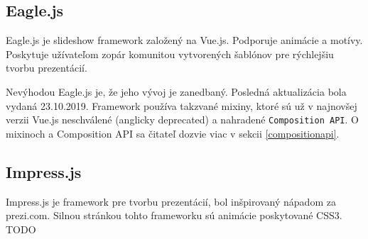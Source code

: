 \subsection{Eagle.js}
Eagle.js je slideshow framework založený na Vue.js. Podporuje animácie a motívy. Poskytuje užívateľom zopár komunitou vytvorených šablónov pre rýchlejšiu tvorbu prezentácií. 

Nevýhodou Eagle.js je, že jeho vývoj je zanedbaný. Posledná aktualizácia bola vydaná 23.10.2019. Framework používa takzvané mixiny, ktoré sú už v najnovšej verzii Vue.js neschválené (anglicky deprecated) a nahradené \texttt{Composition API}. O mixinoch a Composition API sa čitateľ dozvie viac v sekcii \ref{compositionapi}.

\subsection{Impress.js}
Impress.js je framework pre tvorbu prezentácií, bol inšpirovaný nápadom za prezi.com. Silnou stránkou tohto frameworku sú animácie poskytované CSS3.
TODO